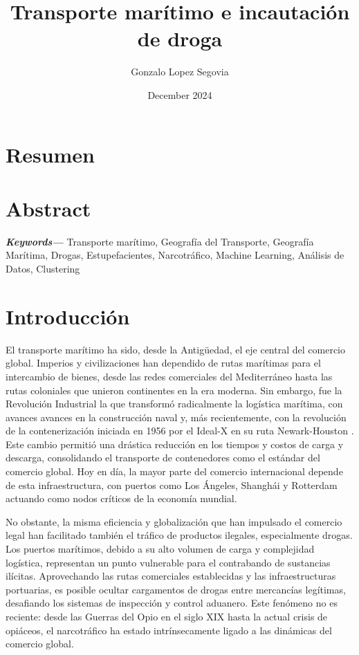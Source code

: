 \documentclass[12pt]{article}
\title{Transporte marítimo e incautación de droga}
\author{Gonzalo Lopez Segovia}
\date{December 2024}
\providecommand{\keywords}[1]
{
	\small	
	\textbf{\textit{Keywords---}} #1
}
\begin{document}
	

	
\Large

\maketitle

\newpage

\section{\label{resumen}Resumen}

\section{\label{abstract}Abstract}


\keywords{Transporte marítimo, Geografía del Transporte, Geografía Marítima, Drogas, Estupefacientes, Narcotráfico, Machine Learning, Análisis de Datos, Clustering}

\newpage

\section{\label{intro}Introducción}
	El transporte marítimo ha sido, desde la Antigüedad, el eje central del comercio global. Imperios y civilizaciones han dependido de rutas marítimas para el intercambio de bienes, desde las redes comerciales del Mediterráneo hasta las rutas coloniales que unieron continentes en la era moderna. Sin embargo, fue la Revolución Industrial la que transformó radicalmente la logística marítima, con avances avances en la construcción naval y, más recientemente, con la revolución de la contenerización iniciada en 1956 por el Ideal-X en su ruta Newark-Houston \cite[]{}. Este cambio permitió una drástica reducción en los tiempos y costos de carga y descarga, consolidando el transporte de contenedores como el estándar del comercio global. Hoy en día, la mayor parte del comercio internacional depende de esta infraestructura, con puertos como Los Ángeles, Shanghái y Rotterdam actuando como nodos críticos de la economía mundial.
	
	No obstante, la misma eficiencia y globalización que han impulsado el comercio legal han facilitado también el tráfico de productos ilegales, especialmente drogas. Los puertos marítimos, debido a su alto volumen de carga y complejidad logística, representan un punto vulnerable para el contrabando de sustancias ilícitas. Aprovechando las rutas comerciales establecidas y las infraestructuras portuarias, es posible ocultar cargamentos de drogas entre mercancías legítimas, desafiando los sistemas de inspección y control aduanero. Este fenómeno no es reciente: desde las Guerras del Opio en el siglo XIX hasta la actual crisis de opiáceos, el narcotráfico ha estado intrínsecamente ligado a las dinámicas del comercio global.
	
\end{document}
